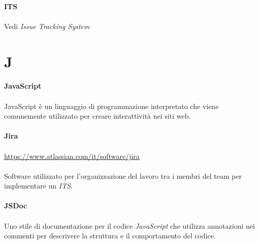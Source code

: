 \documentclass[10pt, a4paper]{article}
\begin{document}
\vspace{2em}
\paragraph{ITS}\noindent\hrulefill
\paragraph{}Vedi \textit{Issue Tracking System\pg}

\newpage
\section{J}
\vspace{2em}
\paragraph{JavaScript}\noindent\hrulefill
\paragraph{}JavaScript è un linguaggio di programmazione interpretato che viene comunemente utilizzato per creare interattività nei siti web.

\vspace{2em}
\paragraph{Jira}\noindent\hrulefill
\paragraph{}\href{https://www.atlassian.com/it/software/jira}{https://www.atlassian.com/it/software/jira}\\\\
Software utilizzato per l'organizzazione del lavoro tra i membri del team per implementare un \textit{ITS\pg}.

\vspace{2em}
\paragraph{JSDoc}\noindent\hrulefill
\paragraph{}Uno stile di documentazione per il codice \textit{JavaScript\pg} che utilizza annotazioni nei commenti per descrivere la struttura e il comportamento del codice.
\end{document}
